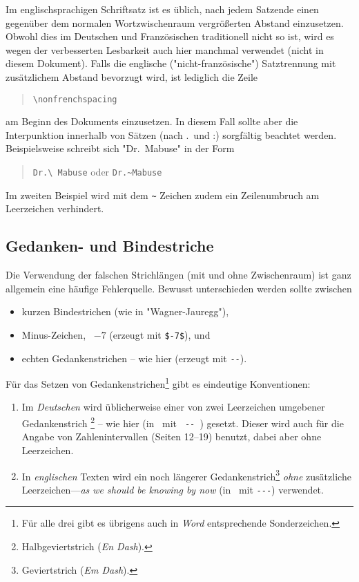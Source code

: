 Im englischsprachigen Schriftsatz ist es üblich, nach jedem Satzende einen
gegenüber dem normalen Wortzwischenraum vergrößerten Abstand einzusetzen.
Obwohl dies im Deutschen und Französischen traditionell nicht so ist, wird es
wegen der verbesserten Lesbarkeit auch hier manchmal verwendet (nicht in
diesem Dokument). Falls die englische ("nicht-französische") Satztrennung mit
zusätzlichem Abstand bevorzugt wird, ist lediglich die Zeile
%
\begin{quote}
    \verb!\nonfrenchspacing!
\end{quote}
%
am Beginn des Dokuments einzusetzen. In diesem Fall sollte aber die
Interpunktion innerhalb von Sätzen (nach .\ und :) sorgfältig beachtet werden.
Beispielsweise schreibt sich "Dr.\ Mabuse" in der Form
%
\begin{quote}
    \verb!Dr.\ Mabuse! oder \verb!Dr.~Mabuse!
\end{quote}
%
Im zweiten Beispiel wird mit dem \verb!~! Zeichen zudem ein Zeilenumbruch am
Leerzeichen verhindert.

\subsection{Gedanken- und Bindestriche}
\label{sec:gedankenstrich}

Die Verwendung der falschen Strichlängen (mit und ohne Zwischenraum) ist ganz
allgemein eine häufige Fehlerquelle. Bewusst unterschieden werden sollte
zwischen
%
\begin{itemize}
    \item kurzen Bindestrichen (wie in "Wagner-Jauregg"), %
    \item Minus-Zeichen, \zB\ $-7$ (erzeugt mit \verb!$-7$!), und %
    \item echten Gedankenstrichen -- wie hier (erzeugt mit \verb!--!).
\end{itemize}
%
\noindent
Für das Setzen von Gedankenstrichen\footnote{Für alle drei gibt es übrigens
auch in \emph{Word} entsprechende Sonderzeichen.} gibt es eindeutige
Konventionen:
%
\begin{enumerate}
    \item Im \emph{Deutschen} wird üblicherweise einer von zwei
    Leerzeichen umgebener Gedankenstrich%
    \footnote{Halbgeviertstrich (\emph{En Dash}).} -- wie hier (in \latex\ mit {\verb*! -- !}) gesetzt.
    Dieser wird auch für die Angabe von Zahlenintervallen (Seiten 12--19)
    benutzt, dabei aber ohne Leerzeichen.
%
    \item In \emph{englischen} Texten wird ein noch längerer
    Gedankenstrich\footnote{Geviertstrich (\emph{Em Dash}).} \emph{ohne}
    zusätzliche Leerzeichen---\emph{as we should be knowing by now}
    (in \latex\ mit {\verb*!---!}) verwendet.
%
\end{enumerate}

